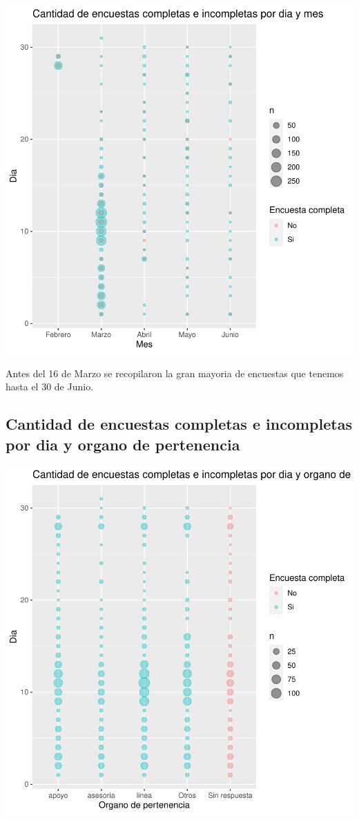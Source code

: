 \documentclass{article}
\begin{document}
\includegraphics{seguimientov3-015}

Antes del 16 de Marzo se recopilaron la gran mayoria de encuestas que tenemos hasta el 30 de Junio.

\subsection{Cantidad de encuestas completas e incompletas por dia y organo de pertenencia}

\includegraphics{seguimientov3-016}
\end{document}
